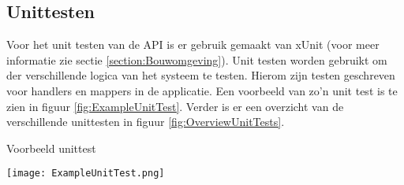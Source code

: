 \subsection{Unittesten}
Voor het unit testen van de API is er gebruik gemaakt van xUnit (voor meer informatie zie sectie \ref{section:Bouwomgeving}).
Unit testen worden gebruikt om der verschillende logica van het systeem te testen.
Hierom zijn testen geschreven voor handlers en mappers in de applicatie.
Een voorbeeld van zo'n unit test is te zien in figuur \ref{fig:ExampleUnitTest}.
Verder is er een overzicht van de verschillende unittesten in figuur \ref{fig:OverviewUnitTests}.

\whitespace[2]
\begin{graphic}
	\captionsetup{type=figure}
	\caption{Voorbeeld unittest }
	\texttt{[image: ExampleUnitTest.png]}
	\label{fig:ExampleUnitTest}
\end{graphic}
